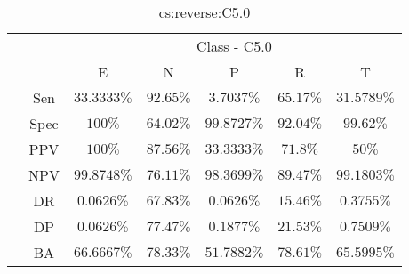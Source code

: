 \begin{table}[!ht]
	\centering
	\begin{tabular}{|c|c|c|c|c|c|c|}
		\cline{3-7}
		\multicolumn{2}{c|}{} & \multicolumn{5}{c|}{Class - C5.0} \\ \cline{3-7}
		\multicolumn{2}{c|}{} & E & N & P & R & T \\ \hline
		\multirow{7}{*}{\rotatebox{90}{Statistics}} & Sen & $33.3333\%$ & $92.65\%$ & $3.7037\%$ & $65.17\%$ & $31.5789\%$ \\ \cline{2-7}
		 & Spec & $100\%$ & $64.02\%$ & $99.8727\%$ & $92.04\%$ & $99.62\%$ \\ \cline{2-7}
		 & PPV & $100\%$ & $87.56\%$ & $33.3333\%$ & $71.8\%$ & $50\%$ \\ \cline{2-7}
		 & NPV & $99.8748\%$ & $76.11\%$ & $98.3699\%$ & $89.47\%$ & $99.1803\%$ \\ \cline{2-7}
		 & DR & $0.0626\%$ & $67.83\%$ & $0.0626\%$ & $15.46\%$ & $0.3755\%$ \\ \cline{2-7}
		 & DP & $0.0626\%$ & $77.47\%$ & $0.1877\%$ & $21.53\%$ & $0.7509\%$ \\ \cline{2-7}
		 & BA & $66.6667\%$ & $78.33\%$ & $51.7882\%$ & $78.61\%$ & $65.5995\%$ \\ \hline
	\end{tabular}
	\caption{cs:reverse:C5.0}
	\label{tab:cs:reverse:C5.0}
\end{table}
